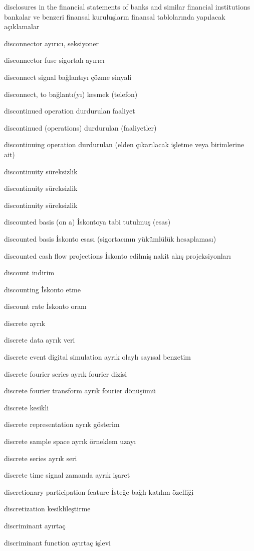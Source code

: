 \documentclass[12pt,fleqn]{article}\usepackage{../../common}
\begin{document}
disclosures in the financial statements of banks and similar financial institutions bankalar ve benzeri finansal kuruluşların finansal tablolarında yapılacak açıklamalar

disconnector ayırıcı, seksiyoner

disconnector fuse sigortalı ayırıcı

disconnect signal bağlantıyı çözme sinyali

disconnect, to bağlantı(yı) kesmek (telefon)

discontinued operation durdurulan faaliyet

discontinued (operations) durdurulan (faaliyetler)

discontinuing operation durdurulan (elden çıkarılacak işletme veya birimlerine ait)

discontinuity süreksizlik

discontinuity süreksizlik

discontinuity süreksizlik

discounted basis (on a) İskontoya tabi tutulmuş (esas)

discounted basis İskonto esası (sigortacının yükümlülük hesaplaması)

discounted cash flow projections İskonto edilmiş nakit akış projeksiyonları

discount indirim

discounting İskonto etme

discount rate İskonto oranı

discrete ayrık

discrete data ayrık veri

discrete event digital simulation ayrık olaylı sayısal benzetim

discrete fourier series ayrık fourier dizisi

discrete fourier transform ayrık fourier dönüşümü

discrete kesikli

discrete representation ayrık gösterim

discrete sample space ayrık örneklem uzayı

discrete series ayrık seri

discrete time signal zamanda ayrık işaret

discretionary participation feature İsteğe bağlı katılım özelliği

discretization kesiklileştirme

discriminant ayırtaç

discriminant function ayırtaç işlevi
\end{document}
